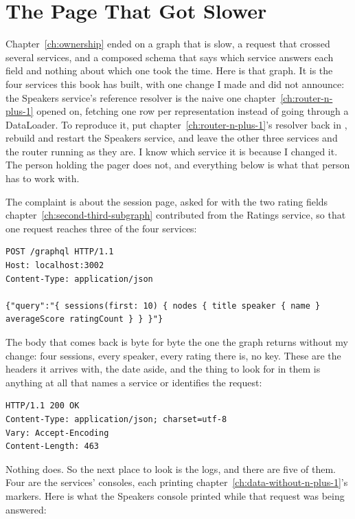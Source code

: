 \section{The Page That Got Slower}
\label{sec:ch18-the-page-that-got-slower}

%
Chapter~\ref{ch:ownership} ended on a graph that is slow, a request that
crossed several services, and a composed schema that says which service
answers each field and nothing about which one took the time. Here is that
graph. It is the four services this book has built, with one change I made
and did not announce: the Speakers service's reference resolver is the naive
one chapter~\ref{ch:router-n-plus-1} opened on, fetching one row per
representation instead of going through a DataLoader. To reproduce it, put chapter~\ref{ch:router-n-plus-1}'s resolver back in
, rebuild and restart the Speakers service, and leave the
other three services and the router running as they are. I know which service
it is because I changed it. The person holding the pager does not, and everything
below is what that person has to work with.

%
The complaint is about the session page, asked for with the two rating fields
chapter~\ref{ch:second-third-subgraph} contributed from the Ratings service, so
that one request reaches three of the four services:

\begin{verbatim}
POST /graphql HTTP/1.1
Host: localhost:3002
Content-Type: application/json

{"query":"{ sessions(first: 10) { nodes { title speaker { name } averageScore ratingCount } } }"}
\end{verbatim}

%
The body that comes back is byte for byte the one the graph returns without my
change: four sessions, every speaker, every rating there is, no 
key. These
are the headers it arrives with, the date aside, and the thing to look for in
them is anything at all that names a service or identifies the request:

\begin{verbatim}
HTTP/1.1 200 OK
Content-Type: application/json; charset=utf-8
Vary: Accept-Encoding
Content-Length: 463
\end{verbatim}

%
Nothing does. So the next place to look is the logs, and there are five of
them. Four are the services' consoles, each printing
chapter~\ref{ch:data-without-n-plus-1}'s  markers. Here is
what the Speakers console printed while that request was being answered:

